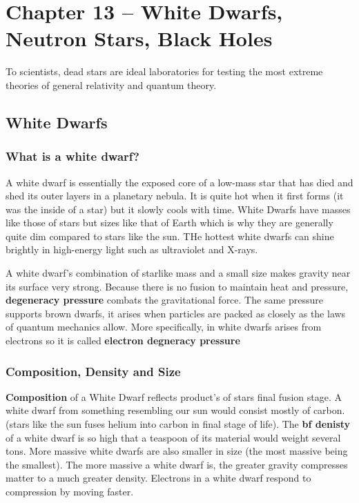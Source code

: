 \section{Chapter 13 -- White Dwarfs, Neutron Stars, Black Holes}
To scientists, dead stars are ideal laboratories for testing the most extreme theories of general relativity and quantum theory.

\subsection{White Dwarfs}
\subsubsection{What is a white dwarf?}
A white dwarf is essentially the exposed core of a low-mass star that has died and shed its outer layers in a planetary nebula. It is quite hot when it first forms (it was the inside of a star) but it slowly cools with time. White Dwarfs have masses like those of stars but sizes like that of Earth which is why they are generally quite dim compared to stars like the sun. THe hottest white dwarfs can shine brightly in high-energy light such as ultraviolet and X-rays.

A white dwarf's combination of starlike mass and a small size makes gravity near its surface very strong. Because there is no fusion to maintain heat and pressure, {\bf degeneracy pressure} combats the gravitational force. The same pressure supports brown dwarfs, it arises when particles are packed as closely as the laws of quantum mechanics allow. More specifically, in white dwarfs arises from electrons so it is called {\bf electron degneracy pressure}

\subsubsection{Composition, Density and Size}
{\bf Composition} of a White Dwarf reflects product's of stars final fusion stage. A white dwarf from something resembling our sun would consist mostly of carbon. (stars like the sun fuses helium into carbon in final stage of life). The {\bf bf denisty} of a white dwarf is so high that a teaspoon of its material would weight several tons. More massive white dwarfs are also smaller in size (the most massive being the smallest). The more massive a white dwarf is, the greater gravity compresses matter to a much greater density. Electrons in a white dwarf respond to compression by moving faster.

